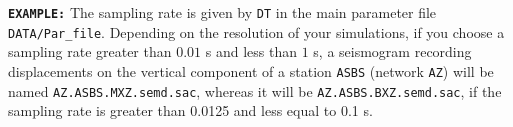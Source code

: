 \noindent \texttt{\textbf{EXAMPLE:}} The sampling rate is given by
\texttt{DT} in the main parameter file \texttt{DATA/Par\_file}. Depending on the resolution of
your simulations, if you choose a sampling rate greater than $0.01$
s and less than $1$ s, a seismogram recording displacements on the
vertical component of a station \texttt{ASBS} (network \texttt{AZ})
will be named \texttt{AZ.ASBS.MXZ.semd.sac}, whereas it will be \texttt{AZ.ASBS.BXZ.semd.sac},
if the sampling rate is greater than 0.0125 and less equal to 0.1
s.


